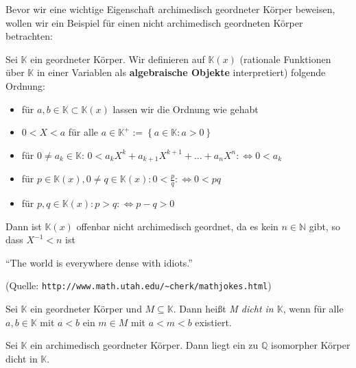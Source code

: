 \documentclass[10pt]{scrbook}
\begin{document}
Bevor wir eine wichtige Eigenschaft archimedisch geordneter Körper beweisen, wollen wir ein Beispiel für einen nicht archimedisch geordneten Körper betrachten:

\begin{Bsp}
Sei $\mathbb{K}$ ein geordneter Körper. Wir definieren auf $\mathbb{K}(x)$ (rationale Funktionen über $\mathbb{K}$ in einer Variablen als \textbf{algebraische Objekte} interpretiert) folgende Ordnung:

\begin{itemize}
	\item für $a, b\in \mathbb{K}\subset \mathbb{K}(x)$ lassen wir die Ordnung wie gehabt
	\item $0<X<a$ für alle $a\in \mathbb{K}^+:=\left\{a\in\mathbb{K}: a>0\right\}$
	\item für $0\neq a_k\in \mathbb{K}$: $0<a_k X^k+a_{k+1} X^{k+1}+\ldots+a_n X^n :\Leftrightarrow 0<a_k$
	\item für $p\in \mathbb{K}(x), 0\neq q\in \mathbb{K}(x): 0<\frac{p}{q} :\Leftrightarrow 0<p q$
	\item für $p, q\in \mathbb{K}(x): p>q :\Leftrightarrow p-q>0$
\end{itemize}

Dann ist $\mathbb{K}(x)$ offenbar nicht archimedisch geordnet, da es kein $n\in\mathbb{N}$ gibt, so dass $X^{-1}<n$ ist
\end{Bsp}

"`The world is everywhere dense with idiots."'

(Quelle: \verb|http://www.math.utah.edu/~cherk/mathjokes.html|)

\begin{Def}
Sei $\mathbb{K}$ ein geordneter Körper und $M\subseteq \mathbb{K}$. Dann heißt \emph{M dicht in $\mathbb{K}$}, wenn für alle $a, b\in \mathbb{K}$ mit $a<b$ ein $m\in M$ mit $a<m<b$ existiert.
\end{Def}

\begin{Sa}
Sei $\mathbb{K}$ ein archimedisch geordneter Körper. Dann liegt ein zu $\mathbb{Q}$ isomorpher Körper dicht in $\mathbb{K}$.
\end{Sa}
\end{document}
